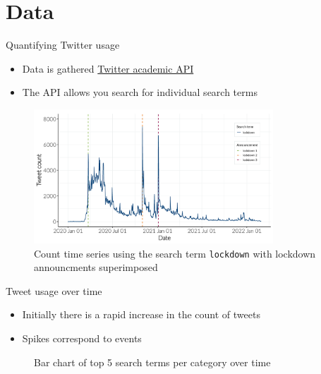 \documentclass{beamer}
\begin{document}
\section{Data}
\begin{frame}{Quantifying Twitter usage}
\begin{itemize}
 \item  Data is gathered \href{https://developer.twitter.com/en/products/twitter-api/academic-research}{Twitter academic
    API} \\[5pt]
 \item  The API allows you search for individual search terms
\end{itemize}
\begin{figure}[!ht]
  \centering
  \includegraphics[width=0.8\textwidth]{figures/lockdown_count.pdf}
  \caption{Count time series using the search term \texttt{lockdown} with
    lockdown announcments superimposed}
\end{figure} 
\end{frame}

\begin{frame}{Tweet usage over time}
  \begin{itemize}
  \item Initially there is a rapid increase in the count of tweets\\[5pt]
  \item Spikes correspond to events
  \end{itemize}

  \begin{figure}[!ht]
    \centering
    \caption{Bar chart of top 5 search terms per category over time}
  \end{figure} 
\end{frame}
\end{document}
